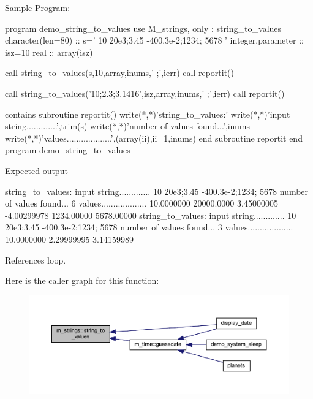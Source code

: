 \begin{DoxyVerb}Sample Program:

  program demo_string_to_values
   use M_strings, only : string_to_values
   character(len=80)  :: s=' 10 20e3;3.45 -400.3e-2;1234; 5678 '
   integer,parameter  :: isz=10
   real               :: array(isz)

   call string_to_values(s,10,array,inums,' ;',ierr)
   call reportit()

   call string_to_values('10;2.3;3.1416',isz,array,inums,' ;',ierr)
   call reportit()

   contains
      subroutine reportit()
         write(*,*)'string_to_values:'
         write(*,*)'input string.............',trim(s)
         write(*,*)'number of values found...',inums
         write(*,*)'values...................',(array(ii),ii=1,inums)
      end subroutine reportit
  end program demo_string_to_values

Expected output

 string_to_values:
 input string............. 10 20e3;3.45 -400.3e-2;1234; 5678
 number of values found...           6
 values...................   10.0000000  20000.0000  3.45000005  -4.00299978  1234.00000  5678.00000
 string_to_values:
 input string............. 10 20e3;3.45 -400.3e-2;1234; 5678
 number of values found...           3
 values...................   10.0000000  2.29999995  3.14159989 \end{DoxyVerb}
 

References loop.

Here is the caller graph for this function\+:
\nopagebreak
\begin{figure}[H]
\begin{center}
\leavevmode
\includegraphics[width=350pt]{namespacem__strings_af3767887ce5c2373a6d9061ea6664bfc_icgraph}
\end{center}
\end{figure}
\mbox{\label{namespacem__strings_a9a923829f31ea70ecada6d214536a704}} 

